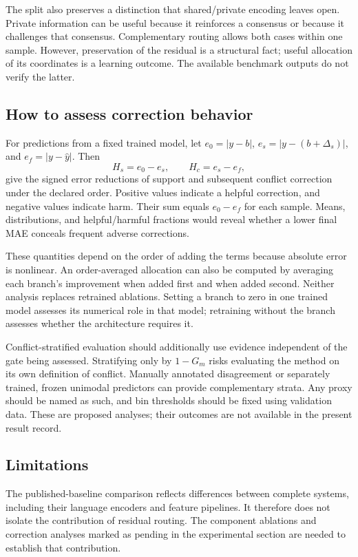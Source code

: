 \documentclass[review,12pt]{elsarticle}
\begin{document}
The split also preserves a distinction that shared/private encoding leaves open. Private information can be useful because it reinforces a consensus or because it challenges that consensus. Complementary routing allows both cases within one sample. However, preservation of the residual is a structural fact; useful allocation of its coordinates is a learning outcome. The available benchmark outputs do not verify the latter.

\subsection{How to assess correction behavior}
For predictions from a fixed trained model, let $e_0=|y-b|$, $e_s=|y-(b+\Delta_s)|$, and $e_f=|y-\hat y|$. Then
\begin{equation}
H_s=e_0-e_s,\qquad H_c=e_s-e_f,
\label{eq:effects}
\end{equation}
give the signed error reductions of support and subsequent conflict correction under the declared order. Positive values indicate a helpful correction, and negative values indicate harm. Their sum equals $e_0-e_f$ for each sample. Means, distributions, and helpful/harmful fractions would reveal whether a lower final MAE conceals frequent adverse corrections.

These quantities depend on the order of adding the terms because absolute error is nonlinear. An order-averaged allocation can also be computed by averaging each branch's improvement when added first and when added second. Neither analysis replaces retrained ablations. Setting a branch to zero in one trained model assesses its numerical role in that model; retraining without the branch assesses whether the architecture requires it.

Conflict-stratified evaluation should additionally use evidence independent of the gate being assessed. Stratifying only by $1-G_m$ risks evaluating the method on its own definition of conflict. Manually annotated disagreement or separately trained, frozen unimodal predictors can provide complementary strata. Any proxy should be named as such, and bin thresholds should be fixed using validation data. These are proposed analyses; their outcomes are not available in the present result record.

\subsection{Limitations}
The published-baseline comparison reflects differences between complete systems, including their language encoders and feature pipelines. It therefore does not isolate the contribution of residual routing. The component ablations and correction analyses marked as pending in the experimental section are needed to establish that contribution.
\end{document}
